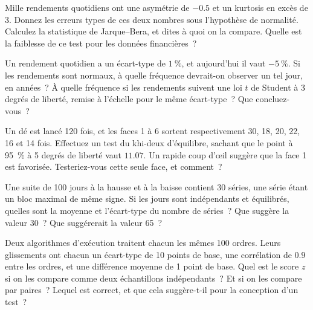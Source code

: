 \begin{question}\label{iq:iv1:statistics:20}
Mille rendements quotidiens ont une asymétrie de $-0.5$ et un kurtosis en excès de 3. Donnez les erreurs types de ces deux nombres sous l'hypothèse de normalité. Calculez la statistique de Jarque--Bera, et dites à quoi on la compare. Quelle est la faiblesse de ce test pour les données financières~?
\end{question}

\begin{question}\label{iq:iv1:statistics:21}
Un rendement quotidien a un écart-type de $1~\%$, et aujourd'hui il vaut $-5~\%$. Si les rendements sont normaux, à quelle fréquence devrait-on observer un tel jour, en années~? À quelle fréquence si les rendements suivent une loi $t$ de Student à 3 degrés de liberté, remise à l'échelle pour le même écart-type~? Que concluez-vous~?
\end{question}

\begin{question}\label{iq:iv1:statistics:22}
Un dé est lancé 120 fois, et les faces 1 à 6 sortent respectivement 30, 18, 20, 22, 16 et 14 fois. Effectuez un test du khi-deux d'équilibre, sachant que le point à 95~\% à 5 degrés de liberté vaut $11.07$. Un rapide coup d'œil suggère que la face 1 est favorisée. Testeriez-vous cette seule face, et comment~?
\end{question}

\begin{question}\label{iq:iv1:statistics:23}
Une suite de 100 jours à la hausse et à la baisse contient 30 séries, une série étant un bloc maximal de même signe. Si les jours sont indépendants et équilibrés, quelles sont la moyenne et l'écart-type du nombre de séries~? Que suggère la valeur 30~? Que suggérerait la valeur 65~?
\end{question}

\begin{question}\label{iq:iv1:statistics:24}
Deux algorithmes d'exécution traitent chacun les mêmes 100 ordres. Leurs glissements ont chacun un écart-type de 10 points de base, une corrélation de $0.9$ entre les ordres, et une différence moyenne de 1 point de base. Quel est le score $z$ si on les compare comme deux échantillons indépendants~? Et si on les compare par paires~? Lequel est correct, et que cela suggère-t-il pour la conception d'un test~?
\end{question}

